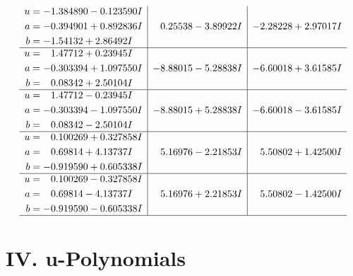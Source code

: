 \documentclass[1p]{elsarticle_modified}
\theoremstyle{definition}
\begin{document}
$$\begin{array}{c|c|c}
\begin{aligned}
u &= -1.384890 - 0.123590 I \\
a &= -0.394901 + 0.892836 I \\
b &= -1.54132 + 2.86492 I\end{aligned}
 & \phantom{-}0.25538 - 3.89922 I & -2.28228 + 2.97017 I \\ \hline\begin{aligned}
u &= \phantom{-}1.47712 + 0.23945 I \\
a &= -0.303394 + 1.097550 I \\
b &= \phantom{-}0.08342 + 2.50104 I\end{aligned}
 & -8.88015 - 5.28838 I & -6.60018 + 3.61585 I \\ \hline\begin{aligned}
u &= \phantom{-}1.47712 - 0.23945 I \\
a &= -0.303394 - 1.097550 I \\
b &= \phantom{-}0.08342 - 2.50104 I\end{aligned}
 & -8.88015 + 5.28838 I & -6.60018 - 3.61585 I \\ \hline\begin{aligned}
u &= \phantom{-}0.100269 + 0.327858 I \\
a &= \phantom{-}0.69814 + 4.13737 I \\
b &= -0.919590 + 0.605338 I\end{aligned}
 & \phantom{-}5.16976 - 2.21853 I & \phantom{-}5.50802 + 1.42500 I \\ \hline\begin{aligned}
u &= \phantom{-}0.100269 - 0.327858 I \\
a &= \phantom{-}0.69814 - 4.13737 I \\
b &= -0.919590 - 0.605338 I\end{aligned}
 & \phantom{-}5.16976 + 2.21853 I & \phantom{-}5.50802 - 1.42500 I\\
 \hline 
 \end{array}$$\newpage
\newpage\renewcommand{\arraystretch}{1}
\centering \section*{ IV. u-Polynomials}
\end{document}

